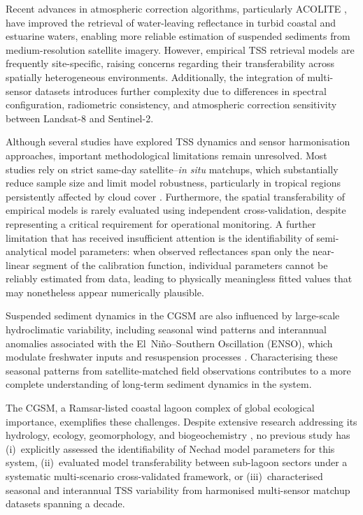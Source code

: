\documentclass[remotesensing,article,submit,pdftex,moreauthors]{Definitions/mdpi}
\begin{document}
Recent advances in atmospheric correction algorithms, particularly
ACOLITE \citep{Vanhellemont2015, Vanhellemont2019}, have improved the
retrieval of water-leaving reflectance in turbid coastal and estuarine
waters, enabling more reliable estimation of suspended sediments from
medium-resolution satellite imagery. However, empirical TSS retrieval
models are frequently site-specific, raising concerns regarding their
transferability across spatially heterogeneous environments.
Additionally, the integration of multi-sensor datasets introduces
further complexity due to differences in spectral configuration,
radiometric consistency, and atmospheric correction sensitivity between
Landsat-8 and Sentinel-2.
 
Although several studies have explored TSS dynamics and sensor
harmonisation approaches, important methodological limitations remain
unresolved. Most studies rely on strict same-day satellite--\textit{in
situ} matchups, which substantially reduce sample size and limit model
robustness, particularly in tropical regions persistently affected by
cloud cover \citep{Pahlevan2022}. Furthermore, the spatial
transferability of empirical models is rarely evaluated using
independent cross-validation, despite representing a critical
requirement for operational monitoring. A further limitation that has
received insufficient attention is the identifiability of semi-analytical
model parameters: when observed reflectances span only the near-linear
segment of the calibration function, individual parameters cannot be
reliably estimated from data, leading to physically meaningless fitted
values that may nonetheless appear numerically plausible.
 
Suspended sediment dynamics in the CGSM are also influenced by
large-scale hydroclimatic variability, including seasonal wind patterns
and interannual anomalies associated with the El~Ni\~{n}o--Southern
Oscillation (ENSO), which modulate freshwater inputs and resuspension
processes \citep{Blanco2006}. Characterising these seasonal patterns
from satellite-matched field observations contributes to a more complete
understanding of long-term sediment dynamics in the system.
 
The CGSM, a Ramsar-listed coastal lagoon complex of global ecological
importance, exemplifies these challenges. Despite extensive research
addressing its hydrology, ecology, geomorphology, and biogeochemistry
\citep{Gonima1998, Blanco2006, Jaramillo2018, Espinoza2025}, no previous
study has (i)~explicitly assessed the identifiability of Nechad model
parameters for this system, (ii)~evaluated model transferability between
sub-lagoon sectors under a systematic multi-scenario cross-validated
framework, or (iii)~characterised seasonal and interannual TSS
variability from harmonised multi-sensor matchup datasets spanning a
decade.
 
\end{document}
